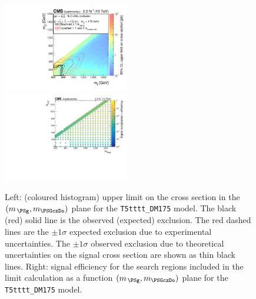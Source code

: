 \clearpage
\begin{figure}[!h]
  \begin{center}
    \includegraphics[width=0.49\textwidth]{RA1T5ttttDM175XSEC_zoomed_aux} \, 
    \includegraphics[width=0.49\textwidth]{T5ttttDM175_merging_4_cats_aux} \,     
  \end{center}
  \caption{Left: (coloured histogram) upper limit on the cross section in the $(m_{\,\PSg}, m_{\PSGczDo})$ plane for the \texttt{T5tttt\_DM175} model. 
  The black (red) solid line is the observed (expected) exclusion. The red dashed lines are the $\pm1\sigma$ expected exclusion due to experimental uncertainties. 
  The $\pm1\sigma$ observed exclusion due to theoretical uncertainties on the signal cross section are shown as thin black lines. 
  Right: signal efficiency for the search regions included in the limit calculation as a function $(m_{\,\PSg}, m_{\PSGczDo})$ plane for the \texttt{T5tttt\_DM175} model. 
  \label{fig:T5ttttDM175_excl}}
\end{figure}


